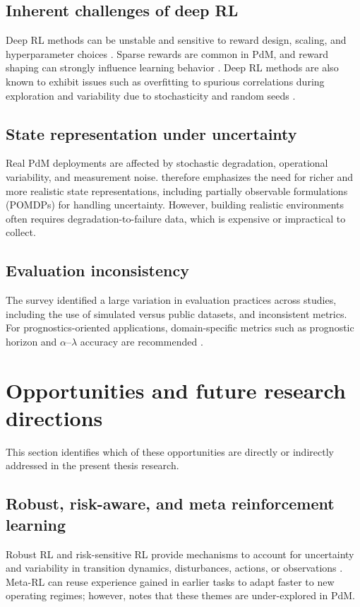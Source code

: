 \documentclass[12pt,oneside]{book}
\begin{document}
\subsection{Inherent challenges of deep RL}
Deep RL methods can be unstable and sensitive to reward design, scaling, and hyperparameter choices \citep{b_SONG,b_HENDERSON,b_HARDT,b_ZHANG,dulac2021}. Sparse rewards are common in PdM, and reward shaping can strongly influence learning behavior \citep{Grzes2017,Fink2020}. Deep RL methods are also known to exhibit issues such as overfitting to spurious correlations during exploration \citep{b_SONG} and variability due to stochasticity and random seeds \citep{b_HENDERSON}.

\subsection{State representation under uncertainty}
Real PdM deployments are affected by stochastic degradation, operational variability, and measurement noise. \cite{Andriotis2021} therefore emphasizes the need for richer and more realistic state representations, including partially observable formulations (POMDPs) for handling uncertainty. However, building realistic environments often requires degradation-to-failure data, which is expensive or impractical to collect.

\subsection{Evaluation inconsistency}
The survey identified a large variation in evaluation practices across studies, including the use of simulated versus public datasets, and inconsistent metrics. For prognostics-oriented applications, domain-specific metrics such as prognostic horizon and $\alpha$--$\lambda$ accuracy are recommended \citep{Saxena2010metrics,Saxena2010evaluating}.

\section{Opportunities and future research directions}\label{sec:slr-opportunities}
This section identifies which of these opportunities are directly or indirectly addressed in the present thesis research.

\subsection{Robust, risk-aware, and meta reinforcement learning}
Robust RL and risk-sensitive RL provide mechanisms to account for uncertainty and variability in transition dynamics, disturbances, actions, or observations \citep{moos2022robust}. Meta-RL can reuse experience gained in earlier tasks to adapt faster to new operating regimes; however, \citet{imagawa2022Meta} notes that these themes are under-explored in PdM.
\end{document}

